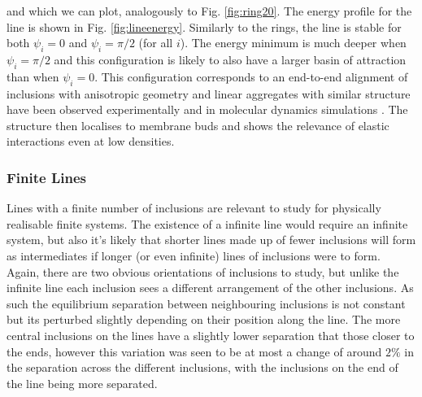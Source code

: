 and which we can plot, analogously to Fig. \ref{fig:ring20}. The energy profile for the line is shown in Fig. \ref{fig:lineenergy}.
Similarly to the rings, the line is stable for both $\psi_i=0$ and $\psi_i=\pi/2$ (for all $i$). The energy minimum is much deeper when $\psi_i=\pi/2$ and this configuration is likely to also have a larger basin of attraction than when $\psi_i=0$. This configuration corresponds to an end-to-end alignment of inclusions with anisotropic geometry\cite{kwiecinski_interactions_2020} and linear aggregates with similar structure have been observed experimentally\cite{simunovic_long-range_2017} and in molecular dynamics simulations \cite{simunovic_linear_2013}. The structure then localises to membrane buds and shows the relevance of elastic interactions even at low densities.


\subsubsection{Finite Lines}
Lines with a finite number of inclusions are relevant to study for physically realisable finite systems. The existence of a infinite line would require an infinite system, but also it's likely that shorter lines made up of fewer inclusions will form as intermediates if longer (or even infinite) lines of inclusions were to form. Again, there are two obvious orientations of inclusions to study, but unlike the infinite line each inclusion sees a different arrangement of the other inclusions. As such the equilibrium separation between neighbouring inclusions is not constant but its perturbed slightly depending on their position along the line. The more central inclusions on the lines have a slightly lower separation that those closer to the ends, however this variation was seen to be at most a change of around $2\%$ in the separation across the different inclusions, with the inclusions on the end of the line being more separated.


